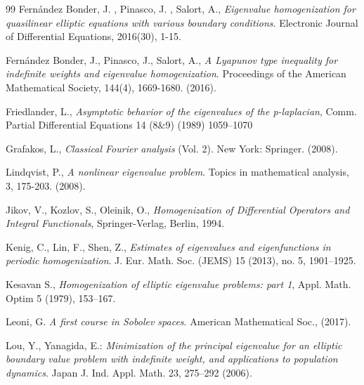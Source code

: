 \documentclass[12pt]{amsart}
\theoremstyle{definition}
\theoremstyle{remark}
\numberwithin{equation}{section}
\begin{document}
\begin{thebibliography}{99}
Fern\'andez Bonder, J. , Pinasco, J. ,   Salort, A., \emph{Eigenvalue homogenization for quasilinear elliptic equations with various boundary conditions}. Electronic Journal of Differential Equations, 2016(30), 1-15.

Fern\'andez Bonder, J., Pinasco, J.,   Salort, A., \emph{A Lyapunov type inequality for indefinite weights and eigenvalue homogenization}. Proceedings of the American Mathematical Society, 144(4), 1669-1680. (2016).

 



 
Friedlander, L.,  \emph{Asymptotic behavior of the eigenvalues of the p-laplacian}, Comm. Partial Differential Equations 14 (8\&9) (1989) 1059–1070 

Grafakos, L., \emph{Classical Fourier analysis} (Vol. 2). New York: Springer. (2008).


Lindqvist, P., \emph{A nonlinear eigenvalue problem}. Topics in mathematical analysis, 3, 175-203. (2008).

Jikov, V., Kozlov, S., Oleinik, O., \emph{Homogenization of Differential Operators
and Integral Functionals}, Springer-Verlag, Berlin, 1994.

Kenig, C., Lin, F., Shen, Z., \emph{Estimates of eigenvalues and eigenfunctions in periodic homogenization}. J. Eur. Math. Soc. (JEMS) 15 (2013), no. 5, 1901--1925.

Kesavan S., \emph{Homogenization of elliptic eigenvalue problems: part 1}, Appl. Math. Optim
5 (1979), 153–167.

Leoni, G. \emph{A first course in Sobolev spaces}. American Mathematical Soc., (2017).

Lou, Y., Yanagida, E.: \emph{Minimization of the principal eigenvalue for an elliptic
boundary value problem with indefinite weight, and applications to population
dynamics}. Japan J. Ind. Appl. Math. 23, 275–292 (2006).




\end{thebibliography}
\end{document}
